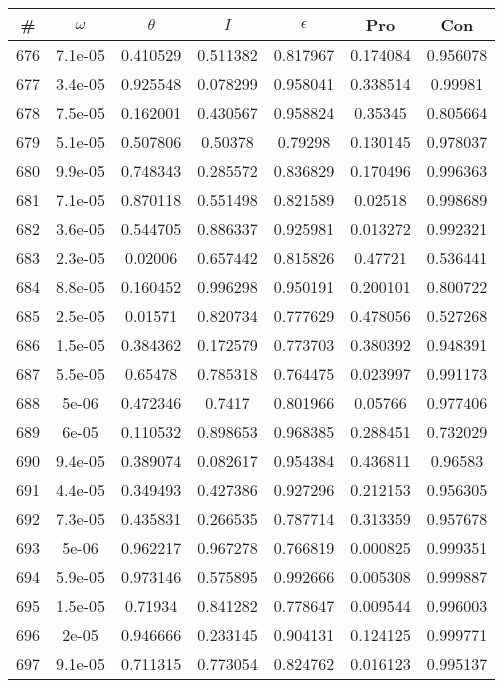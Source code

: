 \newpage
\begin{table}
\begin{tabular}{c|c|c|c|c|c|c}
\# & $\omega$ & $\theta$ & $I$ & $\epsilon$ & Pro & Con\\
\hline
676 & 7.1e-05 & 0.410529 & 0.511382 & 0.817967 & 0.174084 & 0.956078\\
677 & 3.4e-05 & 0.925548 & 0.078299 & 0.958041 & 0.338514 & 0.99981\\
678 & 7.5e-05 & 0.162001 & 0.430567 & 0.958824 & 0.35345 & 0.805664\\
679 & 5.1e-05 & 0.507806 & 0.50378 & 0.79298 & 0.130145 & 0.978037\\
680 & 9.9e-05 & 0.748343 & 0.285572 & 0.836829 & 0.170496 & 0.996363\\
681 & 7.1e-05 & 0.870118 & 0.551498 & 0.821589 & 0.02518 & 0.998689\\
682 & 3.6e-05 & 0.544705 & 0.886337 & 0.925981 & 0.013272 & 0.992321\\
683 & 2.3e-05 & 0.02006 & 0.657442 & 0.815826 & 0.47721 & 0.536441\\
684 & 8.8e-05 & 0.160452 & 0.996298 & 0.950191 & 0.200101 & 0.800722\\
685 & 2.5e-05 & 0.01571 & 0.820734 & 0.777629 & 0.478056 & 0.527268\\
686 & 1.5e-05 & 0.384362 & 0.172579 & 0.773703 & 0.380392 & 0.948391\\
687 & 5.5e-05 & 0.65478 & 0.785318 & 0.764475 & 0.023997 & 0.991173\\
688 & 5e-06 & 0.472346 & 0.7417 & 0.801966 & 0.05766 & 0.977406\\
689 & 6e-05 & 0.110532 & 0.898653 & 0.968385 & 0.288451 & 0.732029\\
690 & 9.4e-05 & 0.389074 & 0.082617 & 0.954384 & 0.436811 & 0.96583\\
691 & 4.4e-05 & 0.349493 & 0.427386 & 0.927296 & 0.212153 & 0.956305\\
692 & 7.3e-05 & 0.435831 & 0.266535 & 0.787714 & 0.313359 & 0.957678\\
693 & 5e-06 & 0.962217 & 0.967278 & 0.766819 & 0.000825 & 0.999351\\
694 & 5.9e-05 & 0.973146 & 0.575895 & 0.992666 & 0.005308 & 0.999887\\
695 & 1.5e-05 & 0.71934 & 0.841282 & 0.778647 & 0.009544 & 0.996003\\
696 & 2e-05 & 0.946666 & 0.233145 & 0.904131 & 0.124125 & 0.999771\\
697 & 9.1e-05 & 0.711315 & 0.773054 & 0.824762 & 0.016123 & 0.995137\\

\end{tabular}
\end{table}
